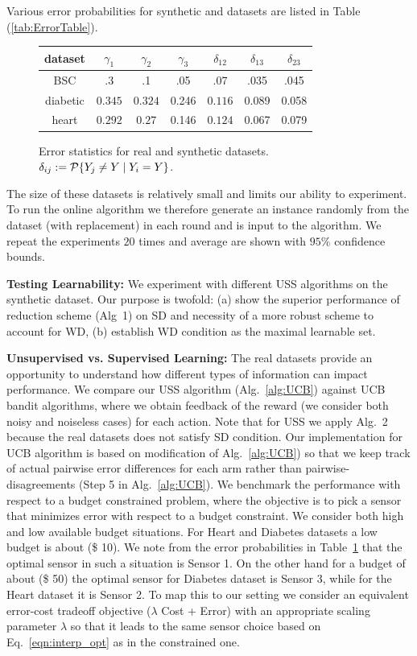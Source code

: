 %
Various error probabilities for synthetic and datasets are listed in Table (\ref{tab:ErrorTable}).  
	\begin{figure}[!h]
		\small
		\begin{tabular}[c]{c|c|c|c|c|c|c } 
			\label{tab:ErrorTable}
			dataset & $\gamma_1$ & $\gamma_2$ & $\gamma_3$ &$\delta_{12}$ & $\delta_{13}$ & $\delta_{23}$ \\ \hline 
			BSC & .3 & .1 & .05 & .07 & .035 & .045\\  \hline
			diabetic & $0.345 $ & $ 0.324$ & 0.246 & $ 0.116 $ & 0.089 &0.058\\  \hline
			heart & $0.292$ & $0.27$ & 0.146 & $0.124$ & 0.067 & 0.079\\  \hline
		\end{tabular}
		\caption{Error statistics for real and synthetic datasets. $\delta_{ij}:=\P\{Y_j\neq Y \mid Y_i = Y\}$.}
\label{tab:error_stats}
	\end{figure}
The size of these datasets is relatively small and limits our ability to experiment. To run the online algorithm we therefore generate an instance randomly from the dataset (with replacement) in each round and is input to the  algorithm. We repeat the experiments $20$ times and average are shown with $95\%$ confidence bounds.

\noindent
{\bf Testing Learnability:}
We experiment with different USS algorithms on the synthetic dataset. Our purpose is twofold: (a) show the superior performance of reduction scheme (Alg~1) on SD and necessity of a more robust scheme to account for WD, (b) establish WD condition as the maximal learnable set.

\noindent
{\bf Unsupervised vs. Supervised Learning:}
The real datasets provide an opportunity to understand how different types of information can impact performance. We compare our USS algorithm (Alg.~\ref{alg:UCB}) against UCB bandit algorithms, where we obtain feedback of the reward (we consider both noisy and noiseless cases) for each action. Note that for USS we apply Alg.~2 because the real datasets does not satisfy SD condition. Our implementation for UCB algorithm is based on modification of Alg.~\ref{alg:UCB}) so that we keep track of actual pairwise error differences for each arm rather than pairwise-disagreements (Step 5 in Alg.~\ref{alg:UCB}). We benchmark the performance with respect to a budget constrained problem, where the objective is to pick a sensor that minimizes error with respect to a budget constraint. We consider both high and low available budget situations. For Heart and Diabetes datasets a low budget is about (\$ 10). We note from the error probabilities in Table~\ref{tab:error_stats} that the optimal sensor in such a situation is Sensor 1. On the other hand for a budget of about (\$ 50) the optimal sensor for Diabetes dataset is Sensor 3, while for the Heart dataset it is Sensor 2. To map this to our setting we consider an equivalent error-cost tradeoff objective ($\lambda$ Cost + Error) with an appropriate scaling parameter $\lambda$ so that it leads to the same sensor choice based on Eq.~\ref{eqn:interp_opt} as in the constrained one.


